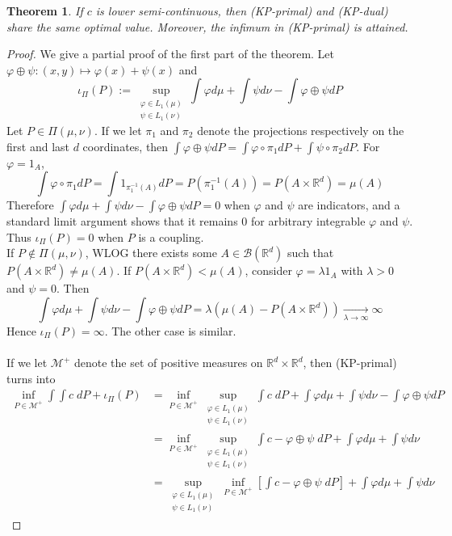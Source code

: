 \documentclass{article}
\newtheorem{thm}{Theorem}[section]
\theoremstyle{definition}
\theoremstyle{remark}
\begin{document}
\begin{thm}
If $c$ is lower semi-continuous, then (KP-primal) and (KP-dual) share the same optimal value. Moreover, the infimum in (KP-primal) is attained.
\end{thm}

\begin{proof}
We give a partial proof of the first part of the theorem. Let $\varphi\oplus \psi:(x,y) \mapsto \varphi(x)+\psi(x)$ and $$\iota_\Pi(P) := \sup_{\substack{\varphi \in L_1(\mu)\\ \psi \in L_1(\nu)}} \int \varphi d\mu + \int \psi d\nu - \int \varphi\oplus \psi dP$$
Let $P\in \Pi(\mu, \nu)$. If we let $\pi_1$ and $\pi_2$ denote the projections respectively on the first and last $d$ coordinates, then $\int \varphi\oplus \psi dP = \int \varphi \circ \pi_1 dP + \int \psi \circ \pi_2 dP$. For $\varphi = 1_A$, $$\int \varphi \circ \pi_1 dP = \int 1_{\pi_1^{-1}(A)} dP = P(\pi_1^{-1}(A)) = P(A\times \mathbb R^d) = \mu(A)$$
Therefore $\int \varphi d\mu + \int \psi d\nu - \int \varphi\oplus \psi dP = 0$ when $\varphi$ and $\psi$ are indicators, and a standard limit argument shows that it remains $0$ for arbitrary integrable $\varphi$ and $\psi$. Thus $\iota_\Pi(P)=0$ when $P$ is a coupling.\\
If $P\notin \Pi(\mu, \nu)$, WLOG there exists some $A\in \mathcal B(\mathbb R^d)$ such that $P(A\times \mathbb R^d)\neq \mu(A)$. If $P(A\times \mathbb R^d)< \mu(A)$, consider $\varphi = \lambda 1_A$ with $\lambda >0$ and $\psi = 0$. Then $$\int \varphi d\mu + \int \psi d\nu - \int \varphi\oplus \psi dP = \lambda (\mu(A) - P(A\times \mathbb R^d)) \xrightarrow[\lambda \to \infty]{} \infty$$ Hence $\iota_\Pi(P)=\infty$. The other case is similar.\\
\\
If we let $\mathcal M^+$ denote the set of positive measures on $\mathbb R^d\times \mathbb R^d$, then (KP-primal) turns into 
$$\begin{aligned}
	\inf_{P\in \mathcal M^+} \int\int c\; dP +  \iota_\Pi(P) 
	&= \inf_{P\in \mathcal M^+} \sup_{\substack{\varphi \in L_1(\mu)\\ \psi \in L_1(\nu)}}  \int c\; dP + \int \varphi d\mu + \int \psi d\nu - \int \varphi\oplus \psi dP \\
	&= \inf_{P\in \mathcal M^+} \sup_{\substack{\varphi \in L_1(\mu)\\ \psi \in L_1(\nu)}}  \int c - \varphi\oplus \psi\; dP + \int \varphi d\mu + \int \psi d\nu \\
	&= \sup_{\substack{\varphi \in L_1(\mu)\\ \psi \in L_1(\nu)}} \inf_{P\in \mathcal M^+}   \left[\int c - \varphi\oplus \psi\; dP\right] + \int \varphi d\mu + \int \psi d\nu

\end{aligned}$$
\end{proof}
\end{document}
